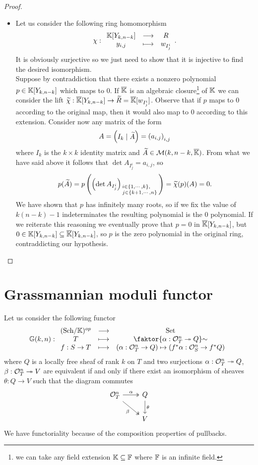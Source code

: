 \begin{proof}
\begin{itemize}
\item Let us consider the following ring homomorphism
\[\chi:\begin{array}{ccc} {\mathbb{K}[Y_{k,n-k}]} & \longrightarrow & {R}\\ {y_{i,j}} & \longmapsto & {w_{I^i_j}} \end{array}.\]
It is obviously surjective so we just need to show that it is injective to find the desired isomorphism.\\
Suppose by contraddiction that there exists a nonzero polynomial $p\in \mathbb{K}[Y_{k,n-k}]$ which maps to $0$. If $\overline{\mathbb{K}}$ is an algebraic closure\footnote{we can take any field extension $\mathbb{K}\subseteq \mathbb{F}$ where $\mathbb{F}$ is an infinite field.} of $\mathbb{K}$ we can consider the lift $\widetilde{\chi}:\overline{\mathbb{K}}[Y_{k,n-k}]\to \widetilde{R}=\overline{\mathbb{K}}[w_{I^i_j}]$. Observe that if $p$ maps to $0$ according to the original map, then it would also map to $0$ according to this extension. Consider now any matrix of the form
\[A=\begin{pmatrix}I_k\mid \widetilde{A}\end{pmatrix}=\left({a_{i,j}}\right)_{i,j}\]
where $I_k$ is the $k\times k$ identity matrix and $\widetilde{A}\in \mathcal{M}(k,n-k,\overline{\mathbb{K}})$. From what we have said above it follows that $\det A_{I^i_j}=a_{i,j}$, so \[p(\widetilde{A})=p\left({\left({\det A_{I^i_j}}\right)_{\begin{smallmatrix}i\in\left\{{1,\cdots, k}\right\},~~~\\ j\in \left\{{k+1,\cdots, n}\right\}\end{smallmatrix}}}\right)=\widetilde{\chi}(p)(A)=0.\] We have shown that $p$ has infinitely many roots, so if we fix the value of $k(n-k)-1$ indeterminates the resulting polynomial is the $0$ polynomial. If we reiterate this reasoning we eventually prove that $p=0$ in $\overline{\mathbb{K}}[Y_{k,n-k}]$, but $0\in \mathbb{K}[Y_{k,n-k}]\subseteq \overline{\mathbb{K}}[Y_{k,n-k}]$, so $p$ is the zero polynomial in the original ring, contraddicting our hypothesis.
\end{itemize}
\setlength{\leftmargini}{0.5cm}
\end{proof}



\section{Grassmannian moduli functor}

Let us consider the following functor
\[\G(k,n):\functorDef{(\Sch\K)\op}{\Set}{T}{\quot{\cpa{\al:\Oc_T^n\onto Q}}\sim}{f:S\to T}{(\al:\Oc_T^n\to Q)\mapsto (f^\ast\al:\Oc_S^n\to f^\ast Q)}\]
where $Q$ is a locally free sheaf of rank $k$ on $T$ and two surjections $\alpha:\mathcal{O}_T^n\twoheadrightarrow Q$, $\beta:\mathcal{O}_T^n\twoheadrightarrow V$ are equivalent if and only if there exist an isomorphism of sheaves $\theta:Q\to V$ such that the diagram commutes
\[\begin{tikzcd}
	{\Oc_T^n} & Q \\
	& V
	\arrow["\al", two heads, from=1-1, to=1-2]
	\arrow["\beta"', two heads, from=1-1, to=2-2]
	\arrow["\theta", from=1-2, to=2-2]
\end{tikzcd}\]
We have functoriality because of the composition properties of pullbacks.

